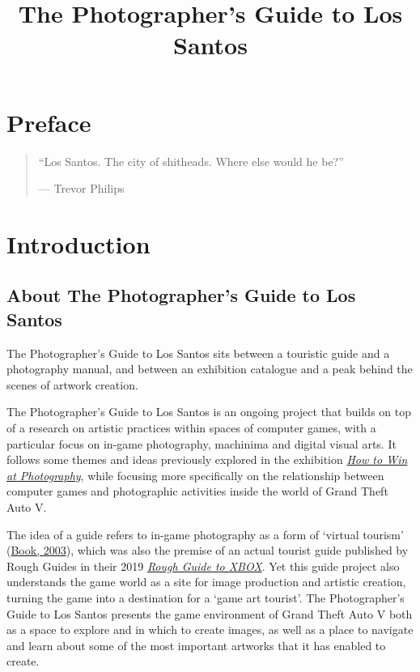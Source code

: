 \documentclass[
  openany]{book}
\title{The Photographer's Guide to Los Santos}
\author{}
\date{\vspace{-2.5em}}
\begin{document}
\maketitle

{
\setcounter{tocdepth}{1}
\tableofcontents
}
\hypertarget{preface}{%
\chapter*{Preface}\label{preface}}

\begin{quote}
``Los Santos. The city of shitheads. Where else would he be?''

--- Trevor Philips
\end{quote}

\hypertarget{introduction}{%
\chapter{Introduction}\label{introduction}}

\hypertarget{about-the-photographers-guide-to-los-santos}{%
\section{About The Photographer's Guide to Los Santos}\label{about-the-photographers-guide-to-los-santos}}

The Photographer's Guide to Los Santos sits between a touristic guide and a photography manual, and between an exhibition catalogue and a peak behind the scenes of artwork creation.

The Photographer's Guide to Los Santos is an ongoing project that builds on top of a research on artistic practices within spaces of computer games, with a particular focus on in-game photography, machinima and digital visual arts. It follows some themes and ideas previously explored in the exhibition \href{https://www.howtowinat.photography/}{\emph{How to Win at Photography}}, while focusing more specifically on the relationship between computer games and photographic activities inside the world of Grand Theft Auto V.

The idea of a guide refers to in-game photography as a form of `virtual tourism' (\href{https://papers.ssrn.com/sol3/papers.cfm?abstract_id=538182}{Book, 2003}), which was also the premise of an actual tourist guide published by Rough Guides in their 2019 \href{https://www.roughguides.com/articles/introduction-to-the-rough-guide-to-xbox/}{\emph{Rough Guide to XBOX}}. Yet this guide project also understands the game world as a site for image production and artistic creation, turning the game into a destination for a `game art tourist'. The Photographer's Guide to Los Santos presents the game environment of Grand Theft Auto V both as a space to explore and in which to create images, as well as a place to navigate and learn about some of the most important artworks that it has enabled to create.
\end{document}
